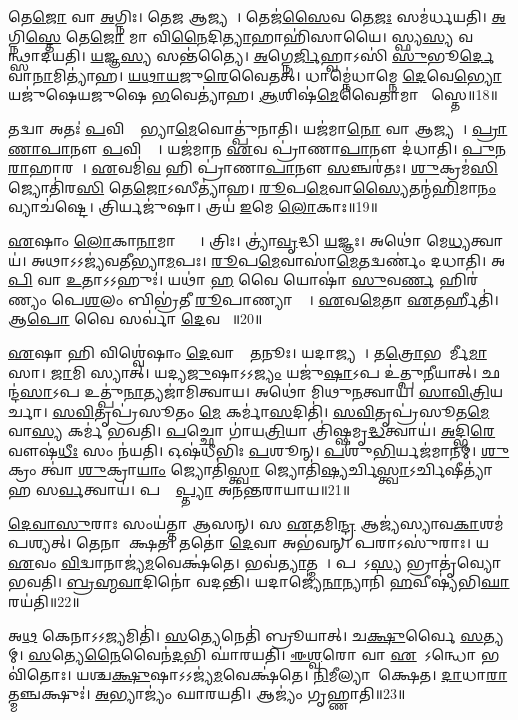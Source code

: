 𑌤𑍇\ul{𑌜𑍋} 𑌵𑌾 \ul{𑌅}𑌗𑍍𑌨𑌿𑌃।
𑌤𑍇\ul{𑌜} 𑌆𑌜𑍍𑌯𑌮𑍍᳚।
𑌤𑍇𑌜॑\ul{𑌸𑍈}𑌵 𑌤𑍇\ul{𑌜𑌃} 𑌸𑌮॑𑌰𑍍𑌧𑌯𑌤𑌿।
\ul{𑌅}𑌗𑍍𑌨𑌿\ul{𑌸𑍍𑌤𑍇} 𑌤𑍇\ul{𑌜𑍋} 𑌮𑌾 𑌵𑌿\ul{𑌨𑍈}𑌦𑌿\ul{𑌤𑍍𑌯𑌾}𑌹𑌾𑌹𑌿॑𑌸𑌾𑌯𑍈।
𑌸𑍍𑌫𑍍𑌯\ul{𑌸𑍍𑌯} 𑌵𑌰𑍍𑌤𑍍𑌮᳚𑌨𑍍𑌥𑍍𑌸𑌾𑌦𑌯𑌤𑌿।
\ul{𑌯}𑌜𑍍𑌞\ul{𑌸𑍍𑌯} 𑌸𑌨𑍍𑌤॑𑌤𑍍𑌯𑍈।
\ul{𑌅}𑌗𑍍𑌨𑍇\ul{𑌰𑍍𑌜𑌿}𑌹𑍍𑌵𑌾𑌽𑌸𑌿॑ \ul{𑌸𑍁}𑌭𑍂\ul{𑌰𑍍𑌦𑍇}𑌵𑌾\ul{𑌨𑌾}𑌮𑌿𑌤𑍍𑌯𑌾॑𑌹।
\ul{𑌯}\ul{𑌥𑌾}\ul{𑌯}𑌜𑍁\ul{𑌰𑍇}𑌵𑍈𑌤𑌤𑍍।
𑌧𑌾𑌮𑍍𑌨𑍇॑𑌧𑌾𑌮𑍍𑌨𑍇 \ul{𑌦𑍇}𑌵𑍇\ul{𑌭𑍍𑌯𑍋} 𑌯𑌜𑍁॑𑌷𑍇𑌯𑌜𑍁𑌷𑍇 \ul{𑌭}𑌵𑍇𑌤𑍍𑌯𑌾॑𑌹।
\ul{𑌆}𑌶𑌿𑌷॑\ul{𑌮𑍇}𑌵𑍈𑌤𑌾𑌮𑌾 𑌶𑌾᳚𑌸𑍍𑌤𑍇॥18॥

𑌤𑌦𑍍𑌵𑌾 𑌅𑌤𑌃॑ \ul{𑌪}𑌵𑌿𑌤𑍍𑌰𑌾᳚𑌭𑍍𑌯𑌾\ul{𑌮𑍇}𑌵𑍋𑌤𑍍𑌪𑍁॑𑌨𑌾𑌤𑌿।
𑌯𑌜॑𑌮𑌾\ul{𑌨𑍋} 𑌵𑌾 𑌆𑌜𑍍𑌯𑌮𑍍᳚।
\ul{𑌪𑍍𑌰𑌾}\ul{𑌣𑌾}\ul{𑌪𑌾}𑌨𑍗 \ul{𑌪}𑌵𑌿𑌤𑍍𑌰𑍇᳚।
𑌯𑌜॑𑌮𑌾𑌨 \ul{𑌏}𑌵 𑌪𑍍𑌰𑌾॑𑌣𑌾\ul{𑌪𑌾}𑌨𑍗 𑌦॑𑌧𑌾𑌤𑌿।
\ul{𑌪𑍁}\ul{𑌨}\ul{𑌰𑌾}𑌹𑌾𑌰𑌮𑍍᳚।
\ul{𑌏}𑌵𑌮𑌿॑\ul{𑌵} 𑌹𑌿 𑌪𑍍𑌰𑌾॑𑌣𑌾\ul{𑌪𑌾}𑌨𑍗 \ul{𑌸}𑌞𑍍𑌚𑌰॑𑌤𑌃।
\ul{𑌶𑍁}𑌕𑍍𑌰𑌮॑\ul{𑌸𑌿} 𑌜𑍍𑌯𑍋𑌤𑌿॑𑌰\ul{𑌸𑌿} 𑌤𑍇\ul{𑌜𑍋}\-𑌽𑌸𑍀𑌤𑍍𑌯𑌾॑𑌹।
\ul{𑌰𑍂}𑌪\ul{𑌮𑍇}𑌵𑌾\ul{𑌸𑍍𑌯𑍈}𑌤𑌨𑍍𑌮॑\ul{𑌹𑌿}𑌮𑌾\ul{𑌨𑌂} 𑌵𑍍𑌯𑌾𑌚॑𑌷𑍍𑌟𑍇।
𑌤𑍍𑌰𑌿𑌰𑍍𑌯𑌜𑍁॑𑌷𑌾।
𑌤𑍍𑌰𑌯॑ \ul{𑌇}𑌮𑍇 \ul{𑌲𑍋}𑌕𑌾𑌃॥19॥

\ul{𑌏}𑌷𑌾𑌂 \ul{𑌲𑍋}𑌕𑌾\ul{𑌨𑌾}𑌮𑌾𑌪𑍍𑌤𑍍𑌯𑍈᳚।
𑌤𑍍𑌰𑌿𑌃।
𑌤𑍍𑌰𑍍𑌯𑌾॑\ul{𑌵𑍃}𑌦𑍍𑌧𑌿 \ul{𑌯}𑌜𑍍𑌞𑌃।
𑌅𑌥𑍋॑ 𑌮𑍇\ul{𑌧𑍍𑌯}𑌤𑍍𑌵𑌾𑌯॑।
𑌅𑌥𑌾𑌽𑌽𑌜𑍍𑌯॑𑌵𑌤𑍀𑌭𑍍𑌯𑌾\ul{𑌮}𑌪𑌃।
\ul{𑌰𑍂}𑌪\ul{𑌮𑍇}𑌵𑌾𑌸𑌾॑\ul{𑌮𑍇}𑌤𑌦𑍍𑌵𑌰𑍍𑌣𑌂॑ 𑌦𑌧𑌾𑌤𑌿।
𑌅\ul{𑌪𑌿} 𑌵𑌾 \ul{𑌉}𑌤𑌾𑌽𑌽𑌹𑍁𑌃॑।
𑌯𑌥𑌾॑ \ul{𑌹} 𑌵𑍈 𑌯𑍋𑌷𑌾॑ \ul{𑌸𑍁}𑌵\ul{𑌰𑍍𑌣}\ul{} 𑌹𑌿𑌰॑𑌣𑍍𑌯𑌂 𑌪𑍇\ul{𑌶}𑌲𑌂 𑌬𑌿𑌭𑍍𑌰॑𑌤𑍀 \ul{𑌰𑍂}𑌪𑌾𑌣𑍍𑌯𑌾𑌸𑍍𑌤𑍇᳚।
\ul{𑌏}𑌵\ul{𑌮𑍇}𑌤𑌾 \ul{𑌏}𑌤𑌰𑍍\mbox{}𑌹𑍀𑌤𑌿॑।
𑌆\ul{𑌪𑍋} 𑌵𑍈 𑌸𑌰𑍍𑌵𑌾॑ \ul{𑌦𑍇}𑌵𑌤𑌾𑌃᳚॥20॥

\ul{𑌏}𑌷𑌾 𑌹𑌿 𑌵𑌿𑌶𑍍𑌵𑍇॑𑌷𑌾𑌂 \ul{𑌦𑍇}𑌵𑌾𑌨𑌾𑌂᳚ \ul{𑌤}𑌨𑍂𑌃।
𑌯𑌦𑌾𑌜𑍍𑌯𑌮𑍍᳚।
𑌤\ul{𑌤𑍍𑌰𑍋}𑌭𑌯𑍋᳚𑌰𑍍𑌮𑍀\ul{𑌮𑌾}\ul{}𑌸𑌾।
\ul{𑌜𑌾}𑌮𑌿 𑌸𑍍𑌯𑌾𑌤𑍍।
𑌯𑌦𑍍𑌯\ul{𑌜𑍁}𑌷𑌾\-𑌽𑌽\ul{𑌜𑍍𑌯𑌂} 𑌯𑌜𑍁॑\ul{𑌷𑌾}𑌽𑌪 𑌉॑𑌤𑍍𑌪𑍁\ul{𑌨𑍀}𑌯𑌾𑌤𑍍।
𑌛𑌨𑍍𑌦॑\ul{𑌸𑌾}𑌽𑌪 𑌉𑌤𑍍𑌪𑍁॑\ul{𑌨𑌾}𑌤𑍍𑌯𑌜𑌾॑𑌮𑌿𑌤𑍍𑌵𑌾𑌯।
𑌅𑌥𑍋॑ 𑌮𑌿𑌥𑍁\ul{𑌨}𑌤𑍍𑌵𑌾𑌯॑।
\ul{𑌸𑌾}\ul{𑌵𑌿}\ul{𑌤𑍍𑌰𑌿}𑌯𑌰𑍍𑌚𑌾।
\ul{𑌸}\ul{𑌵𑌿}𑌤𑍃𑌪𑍍𑌰॑𑌸𑍂𑌤𑌂 \ul{𑌮𑍇} 𑌕𑌰𑍍𑌮𑌾॑\ul{𑌸}𑌦𑌿𑌤𑌿॑।
\ul{𑌸}\ul{𑌵𑌿}𑌤𑍃𑌪𑍍𑌰॑𑌸𑍂𑌤\ul{𑌮𑍇}𑌵𑌾\ul{𑌸𑍍𑌯} 𑌕𑌰𑍍𑌮॑ 𑌭𑌵𑌤𑌿।
\ul{𑌪}𑌚𑍍𑌛𑍋 𑌗𑌾॑𑌯\ul{𑌤𑍍𑌰𑌿}𑌯𑌾 𑌤𑍍𑌰𑌿॑𑌷𑍍𑌷𑌮𑍃\ul{𑌦𑍍𑌧}𑌤𑍍𑌵𑌾𑌯॑।
\ul{𑌅}𑌦𑍍𑌭𑌿\ul{𑌰𑍇}𑌵𑍗𑌷॑\ul{𑌧𑍀𑌃} 𑌸𑌂 𑌨॑𑌯𑌤𑌿।
𑌓𑌷॑𑌧𑍀𑌭𑌿𑌃 \ul{𑌪}𑌶𑍂𑌨𑍍।
\ul{𑌪}𑌶𑍁\ul{𑌭𑌿}𑌰𑍍𑌯𑌜॑𑌮𑌾𑌨𑌮𑍍।
\ul{𑌶𑍁}𑌕𑍍𑌰𑌂 𑌤𑍍𑌵𑌾॑ \ul{𑌶𑍁}𑌕𑍍𑌰𑌾\ul{𑌯𑌾𑌂} 𑌜𑍍𑌯𑍋𑌤𑌿॑\ul{𑌸𑍍𑌤𑍍𑌵𑌾} 𑌜𑍍𑌯𑍋𑌤𑌿॑\ul{𑌷𑍍𑌯}𑌰𑍍𑌚𑌿\ul{𑌸𑍍𑌤𑍍𑌵𑌾}\-𑌽𑌰𑍍𑌚𑌿𑌷𑍀𑌤𑍍𑌯𑌾॑𑌹 𑌸\ul{𑌰𑍍𑌵}𑌤𑍍𑌵𑌾𑌯॑।
𑌪𑌰𑍍𑌯𑌾᳚\ul{𑌪𑍍𑌤𑍍𑌯𑌾} 𑌅𑌨॑𑌨𑍍𑌤𑌰𑌾𑌯𑌾𑌯॥21॥\anuvakamend[\ul{𑌈}\ul{𑌕𑍍𑌷}\ul{𑌤} \ul{𑌆}\ul{𑌹} \ul{𑌶𑌾}\ul{𑌸𑍍𑌤𑍇} \ul{𑌲𑍋}𑌕𑌾 \ul{𑌦𑍇}𑌵𑌤𑌾॑ 𑌭𑌵\ul{𑌤𑌿} 𑌷𑌟𑍍 𑌚॑]

\ul{𑌦𑍇}\ul{𑌵𑌾}\ul{𑌸𑍁}𑌰𑌾𑌃 𑌸𑌂𑌯॑𑌤𑍍𑌤𑌾 𑌆𑌸𑌨𑍍।
𑌸 \ul{𑌏}𑌤𑌮𑌿\ul{𑌨𑍍𑌦𑍍𑌰} 𑌆𑌜𑍍𑌯॑𑌸𑍍𑌯𑌾𑌵\-\ul{𑌕𑌾}𑌶𑌮॑\-𑌪𑌶𑍍𑌯𑌤𑍍।
𑌤𑍇𑌨𑌾𑌵𑍈᳚𑌕𑍍𑌷𑌤।
𑌤𑌤𑍋॑ \ul{𑌦𑍇}𑌵𑌾 𑌅𑌭॑𑌵𑌨𑍍।
𑌪𑌰𑌾𑌽𑌸𑍁॑𑌰𑌾𑌃।
𑌯 \ul{𑌏}𑌵𑌂 \ul{𑌵𑌿}𑌦𑍍𑌵𑌾𑌨𑌾𑌜𑍍𑌯॑\ul{𑌮}𑌵𑍇𑌕𑍍𑌷॑𑌤𑍇।
𑌭𑌵॑\ul{𑌤𑍍𑌯𑌾}𑌤𑍍𑌮𑌨𑌾᳚।
𑌪𑌰𑌾᳚𑌽\ul{𑌸𑍍𑌯} 𑌭𑍍𑌰𑌾𑌤𑍃॑𑌵𑍍𑌯𑍋 𑌭𑌵𑌤𑌿।
\ul{𑌬𑍍𑌰}\ul{𑌹𑍍𑌮}\ul{𑌵𑌾}𑌦𑌿𑌨𑍋॑ 𑌵𑌦𑌨𑍍𑌤𑌿।
𑌯𑌦𑌾𑌜𑍍𑌯𑍇॑\ul{𑌨𑌾}𑌨𑍍𑌯𑌾𑌨𑌿॑ \ul{𑌹}𑌵𑍀𑌷𑍍𑌯॑𑌭𑌿\ul{𑌘𑌾}𑌰𑌯॑𑌤𑌿॥22॥

𑌅\ul{𑌥} 𑌕𑍇𑌨𑌾𑌽𑌽\ul{𑌜𑍍𑌯}𑌮𑌿𑌤𑌿॑।
\ul{𑌸}𑌤𑍍𑌯𑍇𑌨𑍇𑌤𑌿॑ 𑌬𑍍𑌰𑍂𑌯𑌾𑌤𑍍।
𑌚\ul{𑌕𑍍𑌷𑍁}𑌰𑍍𑌵𑍈 \ul{𑌸}𑌤𑍍𑌯𑌮𑍍।
\ul{𑌸}𑌤𑍍𑌯𑍇\ul{𑌨𑍈}𑌵𑍈𑌨॑\ul{𑌦}𑌭𑌿 𑌘𑌾॑𑌰𑌯𑌤𑌿।
\ul{𑌈}\ul{𑌶𑍍𑌵}𑌰𑍋 𑌵𑌾 \ul{𑌏}𑌷𑍋᳚\-𑌽𑌨𑍍𑌧𑍋 𑌭𑌵𑌿॑𑌤𑍋𑌃।
𑌯𑌶𑍍𑌚\ul{𑌕𑍍𑌷𑍁}𑌷𑌾\-𑌽𑌽𑌜𑍍𑌯॑\ul{𑌮}𑌵𑍇𑌕𑍍𑌷॑𑌤𑍇।
\ul{𑌨𑌿}𑌮𑍀𑌲𑍍𑌯𑌾𑌵𑍇᳚𑌕𑍍𑌷𑍇𑌤।
\ul{𑌦𑌾}𑌧𑌾\ul{𑌰𑌾}𑌤𑍍𑌮𑌞𑍍𑌚𑌕𑍍𑌷𑍁𑌃॑।
\ul{𑌅}𑌭𑍍𑌯𑌾𑌜𑍍𑌯𑌂॑ 𑌘𑌾𑌰𑌯𑌤𑌿।
𑌆𑌜𑍍𑌯𑌂॑ 𑌗𑍃𑌹𑍍𑌣𑌾𑌤𑌿॥23॥

